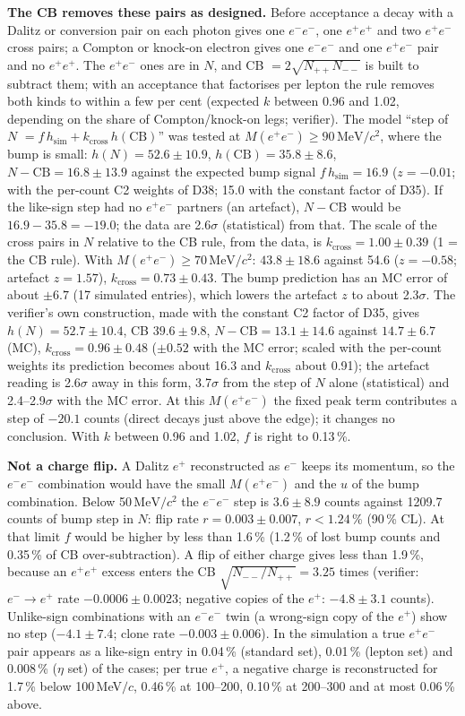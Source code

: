 \documentclass[11pt,a4paper]{article}
\newcommand{\Mee}{\ensuremath{M(e^{+}e^{-})}\xspace}
\newcommand{\MeVcc}{\ensuremath{\mathrm{MeV}/c^{2}}\xspace}
\begin{document}
\textbf{The CB removes these pairs as designed.} Before acceptance a decay with a Dalitz or conversion pair on each photon gives one $e^-e^-$,
one $e^+e^+$ and two $e^+e^-$ cross pairs; a Compton or knock-on electron gives one $e^-e^-$ and one $e^+e^-$ pair and no $e^+e^+$. The $e^+e^-$
ones are in $N$, and CB $=2\sqrt{N_{++}N_{--}}$ is built to subtract them; with an acceptance that factorises per lepton the rule removes both
kinds to within a few per cent (expected $k$ between 0.96 and 1.02, depending on the share of Compton/knock-on legs; verifier). The model ``step of $N$ $=f\,h_{\mathrm{sim}}+k_{\mathrm{cross}}\,h(\mathrm{CB})$'' was tested at \Mee$\ge90$\,\MeVcc, where the
bump is small: $h(N)=52.6\pm10.9$, $h(\mathrm{CB})=35.8\pm8.6$, $N-\mathrm{CB}=16.8\pm13.9$ against the expected bump signal $f\,h_{\mathrm{sim}}=16.9$ ($z=-0.01$; with the
per-count C2 weights of D38; 15.0 with the constant factor of D35). If the like-sign step had no $e^+e^-$ partners (an artefact), $N-\mathrm{CB}$
would be $16.9-35.8=-19.0$; the data are 2.6$\sigma$ (statistical) from that. The scale of the cross pairs in $N$ relative to the CB rule, from
the data, is $k_{\mathrm{cross}}=1.00\pm0.39$ (1 = the CB rule). With \Mee$\ge70$\,\MeVcc: $43.8\pm18.6$ against 54.6 ($z=-0.58$; artefact
$z=1.57$), $k_{\mathrm{cross}}=0.73\pm0.43$. The bump prediction has an MC error of about $\pm6.7$ (17 simulated entries), which lowers the
artefact $z$ to about 2.3$\sigma$. The verifier's own construction, made with the constant C2 factor of D35, gives $h(N)=52.7\pm10.4$, CB
$39.6\pm9.8$, $N-\mathrm{CB}=13.1\pm14.6$ against $14.7\pm6.7$ (MC), $k_{\mathrm{cross}}=0.96\pm0.48$ ($\pm0.52$ with the MC error; scaled with
the per-count weights its prediction becomes about 16.3 and $k_{\mathrm{cross}}$ about 0.91); the artefact reading is 2.6$\sigma$ away in this
form, 3.7$\sigma$ from the step of $N$ alone (statistical) and 2.4--2.9$\sigma$ with the MC error. At this \Mee the
fixed peak term contributes a step of $-20.1$ counts (direct decays just above the edge); it changes no conclusion. With $k$ between 0.96 and 1.02,
$f$ is right to 0.13\,\%.

\textbf{Not a charge flip.} A Dalitz $e^+$ reconstructed as $e^-$ keeps its momentum, so the $e^-e^-$ combination would have the small \Mee and the $u$ of
the bump combination. Below 50\,\MeVcc the $e^-e^-$ step is $3.6\pm8.9$ counts against 1209.7 counts of bump step in $N$: flip rate $r=0.003\pm0.007$,
$r<1.24$\,\% (90\,\% CL). At that limit $f$ would be higher by less than 1.6\,\% (1.2\,\% of lost bump counts and 0.35\,\% of CB over-subtraction).
A flip of either charge gives less than 1.9\,\%, because an $e^+e^+$ excess enters the CB $\sqrt{N_{--}/N_{++}}=3.25$ times (verifier: $e^-\to e^+$
rate $-0.0006\pm0.0023$; negative copies of the $e^+$: $-4.8\pm3.1$ counts).
Unlike-sign combinations with an $e^-e^-$ twin (a wrong-sign copy of the $e^+$) show no step ($-4.1\pm7.4$; clone rate $-0.003\pm0.006$). In the
simulation a true $e^+e^-$ pair appears as a like-sign entry in 0.04\,\% (standard set), 0.01\,\% (lepton set) and 0.008\,\% ($\eta$ set) of
the cases; per true $e^+$, a negative charge is reconstructed for 1.7\,\% below 100\,MeV$/c$, 0.46\,\% at 100--200, 0.10\,\% at 200--300 and at
most 0.06\,\% above.
\end{document}
